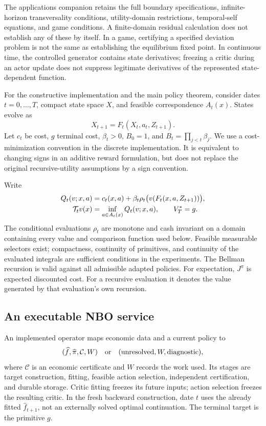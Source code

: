 \documentclass[ecta,nameyear,draft]{econsocart}
\begin{document}
The applications companion retains the full boundary specifications, infinite-horizon transversality conditions, utility-domain restrictions, temporal-self equations, and game conditions. A finite-domain residual calculation does not establish any of these by itself. In a game, certifying a specified deviation problem is not the same as establishing the equilibrium fixed point. In continuous time, the controlled generator contains state derivatives; freezing a critic during an actor update does not suppress legitimate derivatives of the represented state-dependent function.

For the constructive implementation and the main policy theorem, consider dates $t=0,\ldots,T$, compact state space $X$, and feasible correspondence $A_t(x)$. States evolve as
\begin{equation}\label{eq:transition}
 X_{t+1}=F_t(X_t,a_t,Z_{t+1}).
\end{equation}
Let $c_t$ be cost, $g$ terminal cost, $\beta_t>0$, $B_0=1$, and $B_t=\prod_{j<t}\beta_j$. We use a cost-minimization convention in the discrete implementation. It is equivalent to changing signs in an additive reward formulation, but does not replace the original recursive-utility assumptions by a sign convention.

Write
\begin{align}\label{eq:bellman}
 Q_t(v;x,a)&=c_t(x,a)+\beta_t\rho_t\bigl(v(F_t(x,a,Z_{t+1}))\bigr),\\
 \mathcal T_tv(x)&=\inf_{a\in A_t(x)}Q_t(v;x,a),\qquad V_T^*=g.\notag
\end{align}
The conditional evaluations $\rho_t$ are monotone and cash invariant on a domain containing every value and comparison function used below. Feasible measurable selectors exist; compactness, continuity of primitives, and continuity of the evaluated integrals are sufficient conditions in the experiments. The Bellman recursion is valid against all admissible adapted policies. For expectation, $J^\pi$ is expected discounted cost. For a recursive evaluation it denotes the value generated by that evaluation's own recursion.

\subsection{An executable NBO service}
An implemented operator maps economic data and a current policy to
\[
 (\widehat f,\widehat\pi,\mathcal C,W)\quad\hbox{or}\quad
 (\mathrm{unresolved},W,\mathrm{diagnostic}),
\]
where $\mathcal C$ is an economic certificate and $W$ records the work used. Its stages are target construction, fitting, feasible action selection, independent certification, and durable storage. Critic fitting freezes its future inputs; action selection freezes the resulting critic. In the fresh backward construction, date $t$ uses the already fitted $\widehat f_{t+1}$, not an externally solved optimal continuation. The terminal target is the primitive $g$.
\end{document}
